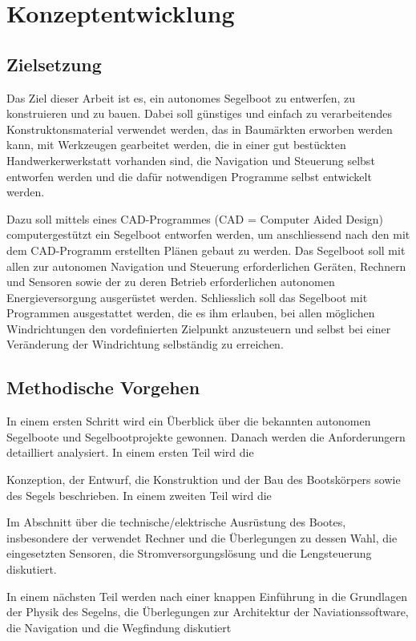 
\chapter{Konzeptentwicklung }
\label{chap:konzeptentwicklung}
\section{Zielsetzung}
Das Ziel dieser Arbeit ist es, ein autonomes Segelboot zu entwerfen, zu konstruieren und zu bauen. Dabei soll günstiges und einfach zu verarbeitendes Konstruktonsmaterial verwendet werden, das in Baumärkten erworben werden kann, mit Werkzeugen gearbeitet werden, die in einer gut bestückten Handwerkerwerkstatt vorhanden sind, die Navigation und Steuerung selbst entworfen werden und die dafür notwendigen Programme selbst entwickelt werden. 

Dazu soll mittels eines CAD-Programmes (CAD = Computer Aided Design) computergestützt ein Segelboot entworfen werden, um anschliessend nach den mit dem CAD-Programm erstellten Plänen gebaut zu werden. Das Segelboot soll mit allen zur autonomen Navigation und Steuerung erforderlichen Geräten, Rechnern und Sensoren sowie der zu deren Betrieb erforderlichen autonomen Energieversorgung ausgerüstet werden. Schliesslich soll das Segelboot mit Programmen ausgestattet werden, die es ihm erlauben, bei allen möglichen Windrichtungen den vordefinierten Zielpunkt anzusteuern und selbst bei einer Veränderung der Windrichtung selbständig zu erreichen.

\section{Methodische Vorgehen}

In einem ersten Schritt wird ein Überblick über die bekannten autonomen Segelboote und Segelbootprojekte gewonnen. Danach werden die Anforderungern detailliert analysiert. 
In einem ersten Teil wird die 

Konzeption, der Entwurf, die Konstruktion und der Bau des Bootskörpers sowie des Segels beschrieben. In einem zweiten Teil wird die

  Im Abschnitt über die technische/elektrische Ausrüstung des Bootes, insbesondere der verwendet Rechner und die Überlegungen zu dessen Wahl, die eingesetzten Sensoren, die Stromversorgungslösung und die Lengsteuerung diskutiert.

 In einem nächsten Teil werden nach einer knappen Einführung in die Grundlagen der Physik des Segelns, die Überlegungen zur Architektur der Naviationssoftware, die Navigation und die Wegfindung diskutiert

